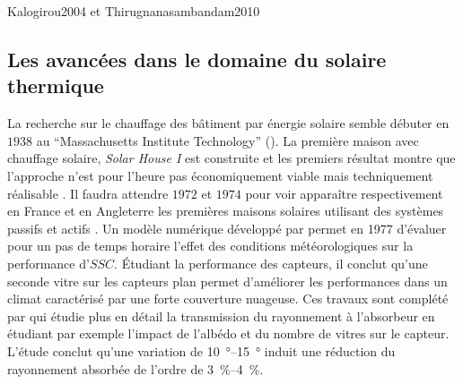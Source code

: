 Kalogirou2004 et Thirugnanasambandam2010




\subsection{Les avancées dans le domaine du solaire thermique} %
\label{sub:les_avancées_dans_le_domaine_du_solaire_thermique}


La recherche sur le chauffage des bâtiment par énergie solaire
semble débuter en $1938$ au \enquote{Massachusetts Institute Technology} ().
La première maison avec chauffage solaire, \textit{Solar House I} est construite et les premiers résultat
montre que l’approche n’est pour l’heure pas économiquement viable mais techniquement réalisable
. Il faudra attendre $1972$ et $1974$ pour voir apparaître respectivement
en France et en Angleterre les premières maisons solaires utilisant des systèmes
passifs et actifs . Un modèle numérique développé
par \textcite{Hunn197733} permet en 1977 d’évaluer pour un pas de temps horaire l’effet
des conditions météorologiques sur la performance d’$SSC$. Étudiant la performance
des capteurs, il conclut qu’une seconde vitre sur les capteurs plan permet d’améliorer
les performances dans un climat caractérisé par une forte couverture nuageuse.
Ces travaux sont complété par \textcite{Elsayed1989} qui étudie plus en détail la
transmission du rayonnement à l’absorbeur en étudiant par exemple
l’impact de l’albédo et du nombre de vitres sur le capteur. L’étude conclut qu’une
variation de \SIrange{10}{15}{\degree} induit une réduction du rayonnement absorbée
de l’ordre de \SIrange{3}{4}{\percent}.


